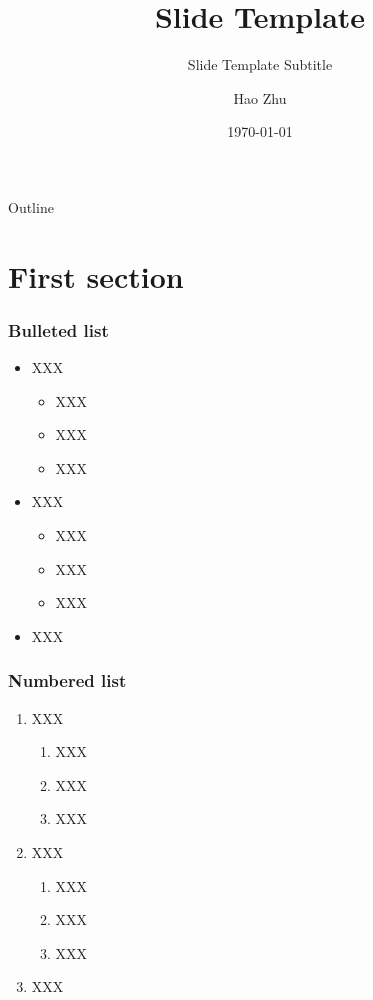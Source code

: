 \documentclass[usepdftitle=false]{beamer}
\title{Slide Template}
\subtitle{Slide Template Subtitle}
\author{Hao Zhu}
\institute{Department of Computer Science\\University of Freiburg}
\date{\today}
\begin{document}
\begin{frame}[plain]
    \titlepage{}
\end{frame}

\begin{frame}{Outline}
    \tableofcontents[subsectionstyle=hide, subsubsectionstyle=hide]
\end{frame}

\section{First section}
\begin{frame}
    \frametitle{Bulleted list}

    \begin{itemize}\itemsep=12pt
        \item XXX
            \vspace*{0.5ex}
            \begin{itemize}
            \item XXX
            \item XXX
            \item XXX
            \end{itemize}
        \item XXX
            \vspace*{0.5ex}
            \begin{itemize}
                \item XXX
                \item XXX
                \item XXX
            \end{itemize}
        \item XXX
    \end{itemize}
\end{frame}

\begin{frame}
    \frametitle{Numbered list}
    
    \begin{enumerate}\itemsep=12pt
        \item XXX
            \vspace*{0.5ex}
            \begin{enumerate}
            \item XXX
            \item XXX
            \item XXX
            \end{enumerate}
        \item XXX
            \vspace*{0.5ex}
            \begin{enumerate}
                \item XXX
                \item XXX
                \item XXX
            \end{enumerate}
        \item XXX
    \end{enumerate}
\end{frame}
\end{document}

